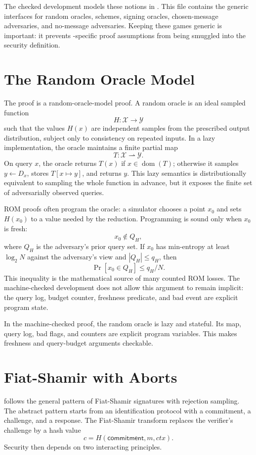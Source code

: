 The checked development models these notions in .  This file
contains the generic interfaces for random oracles, schemes, signing oracles,
chosen-message adversaries, and no-message adversaries.  Keeping these games
generic is important: it prevents \haetae{}-specific proof assumptions from
being smuggled into the security definition.

\section{The Random Oracle Model}

The proof is a random-oracle-model proof.  A random oracle is an ideal sampled
function
\[
  H : \mathcal{X}\to\mathcal{Y}
\]
such that the values \(H(x)\) are independent samples from the prescribed output
distribution, subject only to consistency on repeated inputs.  In a lazy
implementation, the oracle maintains a finite partial map
\[
  T : \mathcal{X} \rightharpoonup \mathcal{Y}.
\]
On query \(x\), the oracle returns \(T(x)\) if \(x\in\operatorname{dom}(T)\);
otherwise it samples \(y\leftarrow D_x\), stores \(T[x\mapsto y]\), and returns
\(y\).  This lazy semantics is distributionally equivalent to sampling the whole
function in advance, but it exposes the finite set of adversarially observed
queries.

ROM proofs often program the oracle: a simulator chooses a point \(x_0\) and
sets \(H(x_0)\) to a value needed by the reduction.  Programming is sound only
when \(x_0\) is fresh:
\[
  x_0\notin Q_H,
\]
where \(Q_H\) is the adversary's prior query set.  If \(x_0\) has min-entropy at
least \(\log_2 N\) against the adversary's view and \(|Q_H|\le q_H\), then
\[
  \Pr[x_0\in Q_H]\le q_H/N.
\]
This inequality is the mathematical source of many counted ROM losses.  The
machine-checked development does not allow this argument to remain implicit:
the query log, budget counter, freshness predicate, and bad event are explicit
program state.

In the machine-checked proof, the random oracle is lazy and stateful.  Its map,
query log, bad flags, and counters are explicit program variables.  This makes
freshness and query-budget arguments checkable.

\section{Fiat-Shamir with Aborts}

\haetae{} follows the general pattern of Fiat-Shamir signatures with rejection
sampling.  The abstract pattern starts from an identification protocol with a
commitment, a challenge, and a response.  The Fiat-Shamir transform replaces the
verifier's challenge by a hash value
\[
  c = H(\mathsf{commitment},m,ctx).
\]
Security then depends on two interacting principles.

